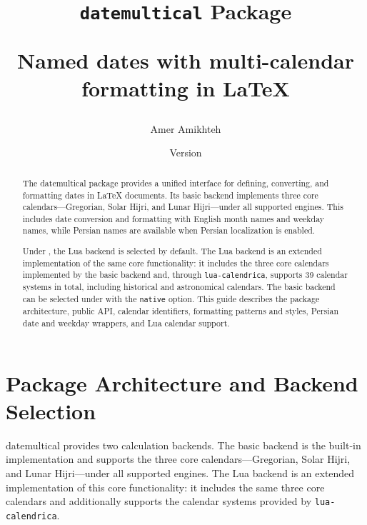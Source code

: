 \documentclass[10pt]{article}
\title{{\Huge\bfseries \texttt{datemultical} Package }\par
    \large Named dates with multi-calendar formatting
    in \LaTeX}
\author{Amer Amikhteh}
\date{Version \dmc@version \\[2pt]
 \dmc{datemultical}{long}}
\newcommand{\LuaLaTeXLogo}{\hologo{LuaLaTeX}}
\newcommand{\pkg}[1]{\textsf{#1}}
\begin{document}
    
    \maketitle
    \thispagestyle{empty}
    
\begin{abstract}
    The \pkg{datemultical} package provides a unified interface for defining,
    converting, and formatting dates in \LaTeX{} documents. Its basic backend
    implements three core calendars---Gregorian, Solar Hijri, and Lunar
    Hijri---under all supported engines. This includes date conversion and formatting with English  month names and weekday names, while Persian names are available when Persian localization is enabled.
    
    Under \LuaLaTeXLogo{}, the Lua backend is selected by default. The Lua
    backend is an extended implementation of the same core functionality: it
    includes the three core calendars implemented by the basic backend and,
    through \texttt{lua-calendrica}, supports 39 calendar systems in total,
    including historical and astronomical calendars.
    The basic backend
    can be selected under \LuaLaTeXLogo{} with the \texttt{native} option.
    This guide describes the package architecture, public API, calendar
    identifiers, formatting patterns and styles, Persian date and weekday
    wrappers, and Lua calendar support.
\end{abstract}

 
   
   
   \section{Package Architecture and Backend Selection}
   
   \pkg{datemultical} provides two calculation backends. The basic backend is
   the built-in implementation and supports the three core calendars---Gregorian,
   Solar Hijri, and Lunar Hijri---under all supported engines. The Lua backend is
   an extended implementation of this core functionality: it includes the same
   three core calendars and additionally supports the calendar systems provided by
   \texttt{lua-calendrica}.
   
\end{document}
